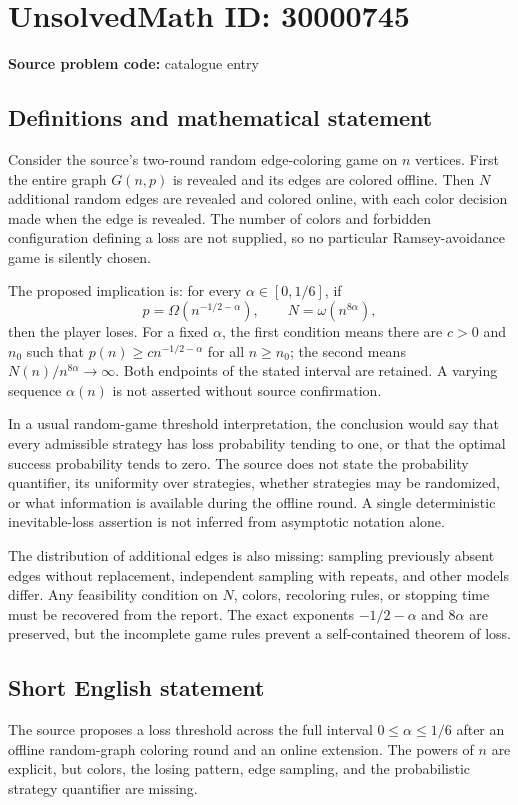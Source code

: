 \documentclass[11pt]{article}
\begin{document}
\section*{UnsolvedMath ID: 30000745}
\textbf{Source problem code:} catalogue entry
\subsection{Definitions and mathematical statement}
Consider the source's two-round random edge-coloring game on $n$ vertices. First the entire graph $G(n,p)$ is revealed and its edges are colored offline. Then $N$ additional random edges are revealed and colored online, with each color decision made when the edge is revealed. The number of colors and forbidden configuration defining a loss are not supplied, so no particular Ramsey-avoidance game is silently chosen.

The proposed implication is: for every $\alpha\in[0,1/6]$, if
\[
 p=\Omega(n^{-1/2-\alpha}),\qquad
 N=\omega(n^{8\alpha}),
\]
then the player loses. For a fixed $\alpha$, the first condition means there are $c>0$ and $n_0$ such that $p(n)\ge c n^{-1/2-\alpha}$ for all $n\ge n_0$; the second means $N(n)/n^{8\alpha}\to\infty$. Both endpoints of the stated interval are retained. A varying sequence $\alpha(n)$ is not asserted without source confirmation.

In a usual random-game threshold interpretation, the conclusion would say that every admissible strategy has loss probability tending to one, or that the optimal success probability tends to zero. The source does not state the probability quantifier, its uniformity over strategies, whether strategies may be randomized, or what information is available during the offline round. A single deterministic inevitable-loss assertion is not inferred from asymptotic notation alone.

The distribution of additional edges is also missing: sampling previously absent edges without replacement, independent sampling with repeats, and other models differ. Any feasibility condition on $N$, colors, recoloring rules, or stopping time must be recovered from the report. The exact exponents $-1/2-\alpha$ and $8\alpha$ are preserved, but the incomplete game rules prevent a self-contained theorem of loss.
\subsection{Short English statement}
The source proposes a loss threshold across the full interval $0\le\alpha\le1/6$ after an offline random-graph coloring round and an online extension. The powers of $n$ are explicit, but colors, the losing pattern, edge sampling, and the probabilistic strategy quantifier are missing.
\end{document}
